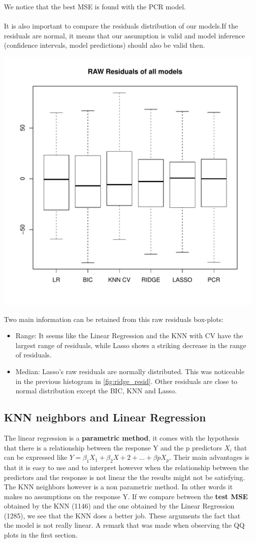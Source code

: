 \documentclass[]{report}
\begin{document}
We notice that the best MSE is found with the PCR model.
\\\\
It is also important to compare the residuals distribution of our models.If the residuals are normal, it means that our assumption is valid and model inference (confidence intervals, model predictions) should also be valid then.

\begin{center}
	\includegraphics[width=0.8\linewidth]{Figures/all_resid.pdf}
\end{center}
Two main information can be retained from this raw residuals box-plots: 
\begin{itemize}
\item Range: It seems like the Linear Regression and the KNN with CV have the largest range of residuals, while Lasso shows a striking decrease in the range of residuals.
\item Median: Lasso's raw residuals are normally distributed. This was noticeable in the previous histogram in \ref{fig:ridge_resid}. Other residuals are close to normal distribution except the BIC, KNN and Lasso.
\end{itemize}

\subsection{KNN neighbors and Linear Regression}
 The linear regression is a \textbf{parametric method}, it comes with the hypothesis that there is a relationship between the response Y and the p predictors $X_{i}$ that can be expressed like $Y =\beta_{1}X_{1}+\beta_{2}X+{2}+...+\beta{p}X_{p}$. Their main advantages is that it is easy to use and to interpret however when the relationship between the predictors and the response is not linear the the results might not be satisfying. The KNN neighbors however is a non parametric method. In other words it makes no assumptions on the response Y. If we compare between the \textbf{test MSE} obtained by the KNN (1146) and the one obtained by the Linear Regression (1285), we see that the KNN does a better job. These arguments the fact that the model is not really linear. A remark that was made when observing the QQ plots in the first section. 
\end{document}
